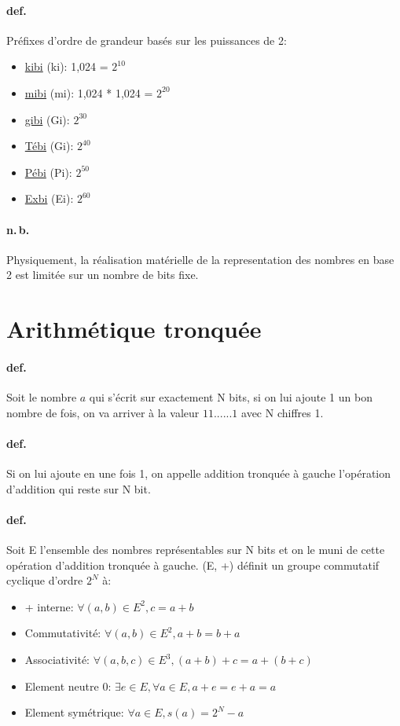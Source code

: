 \documentclass{report}
\begin{document}
  \paragraph{def.} Préfixes d'ordre de grandeur basés sur les puissances de 2:
  \begin{itemize}
    \item \underline{kibi} (ki): 1,024 = $2^{10}$
    \item \underline{mibi} (mi): 1,024 * 1,024 = $2^{20}$
    \item \underline{gibi} (Gi): $2^{30}$
    \item \underline{Tébi} (Gi): $2^{40}$
    \item \underline{Pébi} (Pi): $2^{50}$
    \item \underline{Exbi} (Ei): $2^{60}$
  \end{itemize}

  \paragraph{n.\,b.} Physiquement, la réalisation matérielle de la representation des nombres en base 2 est limitée sur un nombre de bits fixe.

\section{Arithmétique tronquée}

  \paragraph{def.} Soit le nombre $a$ qui s'écrit sur exactement N bits, si on lui ajoute 1 un bon nombre de fois, on va arriver à la valeur $11......1$ avec N chiffres 1.

  \paragraph{def.} Si on lui ajoute en une fois 1, on appelle addition tronquée à gauche l'opération d'addition qui reste sur N bit.

  \paragraph{def.} Soit E l'ensemble des nombres représentables sur N bits et on le muni de cette opération d'addition tronquée à gauche. (E, +) définit un groupe commutatif cyclique d'ordre $2^{N}$ à:
  \begin{itemize}
    \item + interne: $\forall (a,b) \in E^{2}, c = a + b$
    \item Commutativité: $\forall (a,b) \in E^{2}, a + b = b + a$
    \item Associativité: $\forall (a,b,c) \in E^{3}, (a + b) + c = a + (b + c)$
    \item Element neutre 0: $\exists e \in E, \forall a \in E, a + e = e + a = a$
    \item Element symétrique: $\forall a \in E, s(a)=2^{N}-a$
  \end{itemize}
\end{document}
